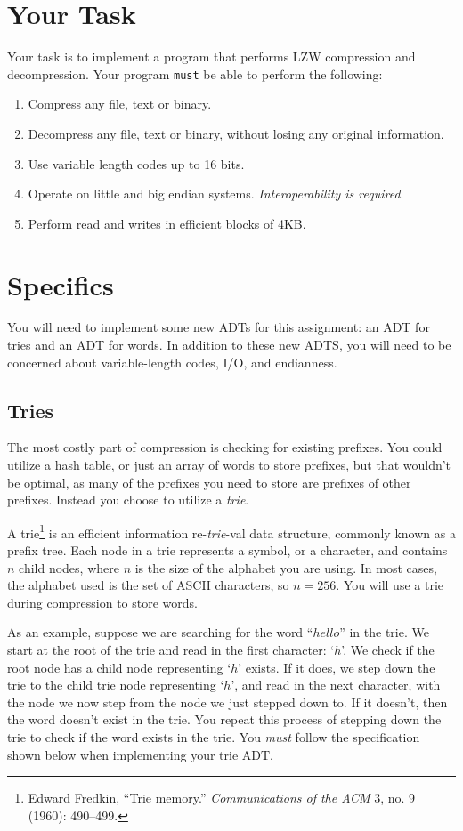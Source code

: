 \documentclass{article}
\begin{document}
\section{Your Task}

Your task is to implement a program that performs LZW compression and
decompression. Your program \texttt{must} be able to perform the following:
\begin{enumerate}
\item Compress any file, text or binary.
\item Decompress any file, text or binary, without losing any original information.
\item Use variable length codes up to 16 bits.
\item Operate on little and big endian systems. \emph{Interoperability is required}.
\item Perform read and writes in efficient blocks of 4KB.
\end{enumerate}

\section{Specifics}

You will need to implement some new ADTs for this assignment: an ADT for tries
and an ADT for words. In addition to these new ADTS, you will need to
be concerned about variable-length codes, I/O, and endianness.

\subsection{Tries}
The most costly part of compression is checking for existing prefixes. You could
utilize a hash table, or just an array of words to store prefixes, but that
wouldn't be optimal, as many of the prefixes you need to store are prefixes of
other prefixes. Instead you choose to utilize a \emph{trie}.

A trie\footnote{Edward Fredkin, ``{T}rie memory.'' \emph{Communications of the
ACM} 3, no. 9 (1960): 490--499.}
is an efficient information re-\emph{trie}-val data structure, commonly
known as a prefix tree. Each node in a trie represents a symbol, or a character,
and contains $n$ child nodes, where $n$
is the size of the alphabet you are using. In most cases, the alphabet used is
the set of ASCII characters, so $n = 256$. You will use a trie during
compression to store words.

As an example, suppose we are searching for the word ``$hello$'' in the trie. We
start at the root of the trie and read in the first character: `$h$'. We check
if the root node has a child node representing `$h$' exists. If it does, we step
down the trie to the child trie node representing `$h$', and read in the next
character, with the node we now step from the node we just stepped down to.  If
it doesn't, then the word doesn't exist in the trie. You repeat this process of
stepping down the trie to check if the word exists in the trie. You \emph{must}
follow the specification shown below when implementing your trie ADT.
\end{document}
